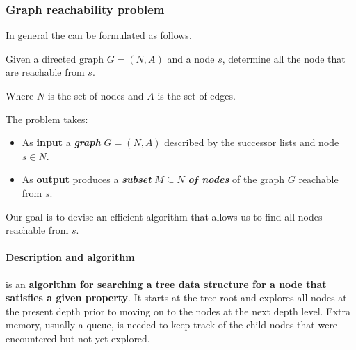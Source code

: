 \longline

\subsubsection{Graph reachability problem}

In general the  can be formulated as follows.

\begin{definitionbox}
    Given a directed graph $G = \left(N,A\right)$ and a node $s$, determine all the node that are reachable from $s$.
\end{definitionbox}

\noindent
Where $N$ is the set of nodes and $A$ is the set of edges.

\highspace
The problem takes:
\begin{itemize}
    \item As \textbf{input} a \emph{\textbf{graph}} $G = \left(N,A\right)$ described by the successor lists and node $s \in N$.
    
    \item As \textbf{output} produces a \emph{\textbf{subset}} $M \subseteq N$ \emph{\textbf{of nodes}} of the graph $G$ reachable from $s$.
\end{itemize}
Our goal is to devise an efficient algorithm that allows us to find all nodes reachable from $s$.

\newpage

\paragraph{Description and algorithm}

\begin{definitionbox}
     is an \textbf{algorithm for searching a tree data structure for a node that satisfies a given property}. It starts at the tree root and explores all nodes at the present depth prior to moving on to the nodes at the next depth level. Extra memory, usually a queue, is needed to keep track of the child nodes that were encountered but not yet explored.
\end{definitionbox}

